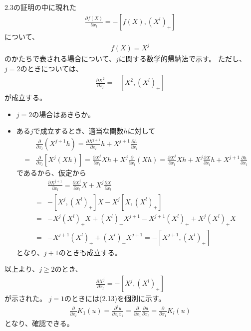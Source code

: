 \documentclass{jsarticle}
\begin{document}
\section{}
2.3の証明の中に現れた
\begin{align}
\frac{\partial f(X)}{\partial x_{l}}=-\left[f(X),\left(X^{l}\right)_{+}\right]
\end{align}
について、
\begin{align}
f(X)=X^{j}
\end{align}
のかたちで表される場合について、$j$に関する数学的帰納法で示す。
ただし、$j=2$のときについては、
\begin{align}
\frac{\partial X^{2}}{\partial x_{l}}=-\left[X^{2},\left(X^{l}\right)_{+}\right]
\end{align}
が成立する。
\begin{itemize}
\item $j=2$の場合はあきらか。
\item ある$j$で成立するとき、適当な関数$h$に対して
\begin{align*}
&\frac{\partial}{\partial x_{l}}(X^{j+1}h)
=\frac{\partial X^{j+1}}{\partial x_{l}}h
+X^{j+1}\frac{\partial h}{\partial x_{l}}\\
=&\frac{\partial}{\partial x_{l}}\left[X^{j}(Xh)\right]
=\frac{\partial X^{j}}{\partial x_{l}}Xh+X^{j}\frac{\partial}{\partial x_{l}}(Xh)
=\frac{\partial X^{j}}{\partial x_{l}}Xh+X^{j}\frac{\partial X}{\partial x_{l}}h
+X^{j+1}\frac{\partial h}{\partial x_{l}}
\end{align*}
であるから、仮定から
\begin{align*}
&\frac{\partial X^{j+1}}{\partial x_{l}}
=\frac{\partial X^{j}}{\partial x_{l}}X
+X^{j}\frac{\partial X}{\partial x_{l}}\\
=&-\left[X^{j},\left(X^{l}\right)_{+}\right]X
-X^{j}\left[X,\left(X^{l}\right)_{+}\right]\\
=&-X^{j}\left(X^{l}\right)_{+}X+\left(X^{l}\right)_{+}X^{j+1}
-X^{j+1}\left(X^{l}\right)_{+}+X^{j}\left(X^{l}\right)_{+}X\\
=&-X^{j+1}\left(X^{l}\right)_{+}+\left(X^{l}\right)_{+}X^{j+1}
=-\left[X^{j+1},\left(X^{l}\right)_{+}\right]
\end{align*}
となり、$j+1$のときも成立する。
\end{itemize}
以上より、$j\geq2$のとき、
\begin{align}
\frac{\partial X^{j}}{\partial x_{l}}=-\left[X^{j},\left(X^{l}\right)_{+}\right]
\end{align}
が示された。
$j=1$のときには(2.13)を個別に示す。
\begin{align*}
\frac{\partial}{\partial x_{l}}K_{1}(u)
=\frac{\partial^{2}u}{\partial x_{l}x_{1}}
=\frac{\partial}{\partial x_{1}}\frac{\partial u}{\partial x_{l}}
=\frac{\partial}{\partial x_{1}}K_{l}(u)
\end{align*}
となり、確認できる。
\end{document}
